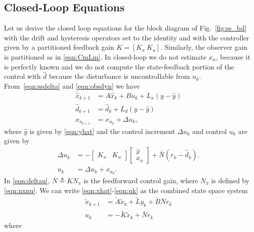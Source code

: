 \documentclass[journal,twocolumn,twoside]{IEEEtran}
\newcommand{\x}{\ensuremath{x }\xspace}
\begin{document}
\subsection{Closed-Loop Equations}
Let us derive the closed loop equations for the block diagram of Fig.~\ref{fig:ss_bd} with the drift and hysteresis operators set to the identity and with the controller given by a partitioned feedback gain ${K = [K_x\: K_u]}$. Similarly, the observer gain is partitioned as in \eqref{eqn:CmLm}.
In closed-loop we do not estimate $\x_u$, because it is perfectly known and we do not compute the state-feedback portion of the control with $\hat d$ because the disturbance is uncontrollable from $u_k$.  
From~\eqref{eqn:ssdelta} and \eqref{eqn:obsdyn} we have
\begin{align}
  \hat{\x}_{k+1} &= A \hat{x}_k + Bu_k + L_x(y - \hat{y})\label{eqn:xhat}\\
  \hat{d}_{k+1}  &= \hat{d}_k  + L_d (y - \hat{y}) \label{eqn:dhat}\\
  x_{u_{k+1}}     &= x_{u_k}  + \Delta{u}_k,\label{eqn:xu}
\end{align}
where $\hat{y}$ is given by \eqref{eqn:yhat} and the control increment $\Delta u_k$ and control $u_k$ are given by
\begin{align}
  \Delta u_k &= -\begin{bmatrix}
    K_x & K_u
  \end{bmatrix}
  \begin{bmatrix}
    \hat{\x} \\ x_u
  \end{bmatrix}
  +
               \bar{N}(r_k - \hat{d}_k).\label{eqn:deltau}\\
  u_k &= \Delta u_k + x_{u_k}\label{eqn:uk}.
\end{align}
In \eqref{eqn:deltau}, $\bar{N}\triangleq KN_x$ is the feedforward control gain, where $N_{\bar{x}}$ is defined by \eqref{eqn:nxnu}.
We can write \eqref{eqn:xhat}-\eqref{eqn:uk} as the combined state space system
\begin{align}
\tilde{\x}_{k+1} &= \tilde{A}\tilde{\x}_k + \tilde{L}y_k + \tilde{B}\bar{N}r_k\label{eqn:cntrldyn}\\
u_k &= -\tilde{K}\tilde{\x}_k + \bar{N} r_k \label{eqn:ukx}
\end{align}
where
\end{document}
